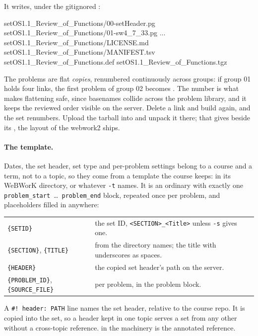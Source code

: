 It writes, under the gitignored :

\begin{manexsource}
setOS1.1_Review_of_Functions/00-setHeader.pg
setOS1.1_Review_of_Functions/01-sw4_7_33.pg   ...
setOS1.1_Review_of_Functions/LICENSE.md
setOS1.1_Review_of_Functions/MANIFEST.tsv
setOS1.1_Review_of_Functions.def
setOS1.1_Review_of_Functions.tgz
\end{manexsource}

The problems are flat \emph{copies}, renumbered continuously across groups: if group 01 holds four links, the first problem of group 02 becomes .
The number is what makes flattening safe, since basenames collide across the problem library, and it keeps the reviewed order visible on the server.
Delete a link and build again, and the set renumbers.
Upload the tarball into  and unpack it there; that gives  beside its , the layout of the  webwork2 ships.

\paragraph{The template.}
Dates, the set header, set type and per-problem settings belong to a course and a term, not to a topic, so they come from a template the course keeps:  in its WeBWorK directory, or whatever \texttt{-t} names.
It is an ordinary  with exactly one \texttt{problem\_start}~\ldots~\texttt{problem\_end} block, repeated once per problem, and placeholders filled in anywhere:

\begin{center}
\begin{tabularx}{\linewidth}{@{}l Y@{}}
\texttt{\{SETID\}} & the set ID, \texttt{<SECTION>\_<Title>} unless \texttt{-s} gives one.\\
\texttt{\{SECTION\}}, \texttt{\{TITLE\}} & from the directory names; the title
  with underscores as spaces.\\
\texttt{\{HEADER\}} & the copied set header's path on the server.\\
\texttt{\{PROBLEM\_ID\}}, \texttt{\{SOURCE\_FILE\}} & per problem, in the
  problem block.\\
\end{tabularx}
\end{center}

A \texttt{\#! header: PATH} line names the set header, relative to the course repo.
It is copied into the set, so a header kept in one topic serves a set from any other without a cross-topic reference.
 in the machinery is the annotated reference.

